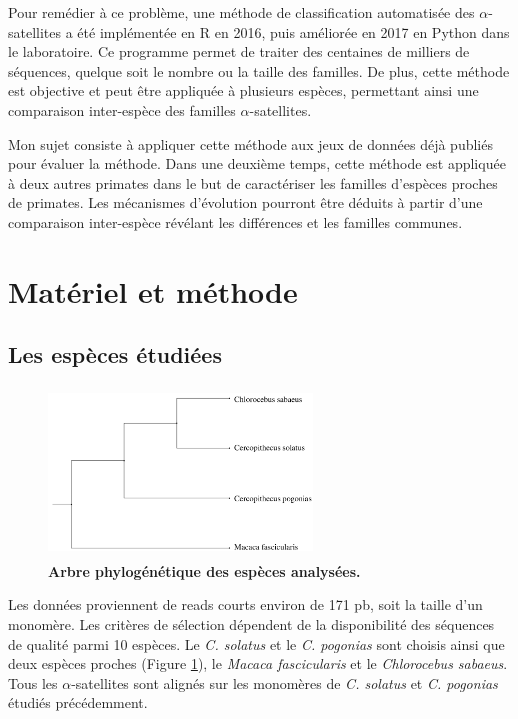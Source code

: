 \documentclass[12pt,a4paper]{article}
\begin{document}
Pour remédier à ce problème, une méthode de classification automatisée des $\alpha$-satellites a été implémentée en R en 2016, puis améliorée en 2017 en Python dans le laboratoire. Ce programme permet de traiter des centaines de milliers de séquences, quelque soit le nombre ou la taille des familles. De plus, cette méthode est objective et peut être appliquée à plusieurs espèces, permettant ainsi une comparaison inter-espèce des familles $\alpha$-satellites. 

Mon sujet consiste à appliquer cette méthode aux jeux de données déjà publiés pour évaluer la méthode. Dans une deuxième temps, cette méthode est appliquée à deux autres primates dans le but de  caractériser les familles d'espèces proches de primates. Les mécanismes d'évolution pourront être déduits à partir d'une comparaison inter-espèce révélant les différences et les familles communes. 

\section{Matériel et méthode}
\subsection{Les espèces étudiées}

	\begin{figure}
		\center
		\includegraphics[height=4.5cm, width=7cm]{img/arbre_especes.png}
		\caption{\textbf{Arbre phylogénétique des espèces analysées.}\cite{Cacheux_evolution}
		\label{fig:arbre_presentation}}
	\end{figure}

Les données proviennent de reads courts environ de 171 pb, soit la taille d'un monomère. Les critères de sélection dépendent de la disponibilité des séquences de qualité parmi 10 espèces. Le \textit{C. solatus} et le \textit{C. pogonias} sont choisis ainsi que deux espèces proches (Figure \ref{fig:arbre_presentation}), le \textit{Macaca fascicularis} et le \textit{Chlorocebus sabaeus}. Tous les $\alpha$-satellites sont alignés sur les monomères de \textit{C. solatus} et \textit{C. pogonias} étudiés précédemment.
\end{document}
